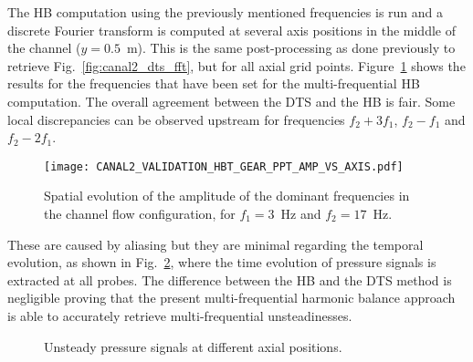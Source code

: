 The HB computation using the previously mentioned frequencies is
run and a discrete Fourier transform is computed at several axis positions
in the middle of the channel ($y=0.5$~m). 
This is the same post-processing as done previously to retrieve 
Fig.~\ref{fig:canal2_dts_fft}, but for all axial grid points.
Figure~\ref{fig:canal2_validation_hbt_gear_amp_vs_axis}
shows the results for the frequencies that have been set for the 
multi-frequential HB computation.
The overall agreement between the DTS and the HB is fair.  
Some local discrepancies can be
observed upstream for frequencies $f_2 + 3f_1$, $f_2 - f_1$ and $f_2 -
2f_1$. 
\begin{figure}[htp]
  \centering
  \texttt{[image: CANAL2\_VALIDATION\_HBT\_GEAR\_PPT\_AMP\_VS\_AXIS.pdf]}
  \caption{Spatial evolution of the amplitude of the dominant
    frequencies in the channel flow configuration, for $f_1 = 3$~Hz and $f_2 = 17$~Hz.}
  \label{fig:canal2_validation_hbt_gear_amp_vs_axis}
\end{figure}
These are caused by aliasing
but they are minimal regarding the temporal evolution, as
shown in Fig.~\ref{fig:canal2_validation_hbt_gear_time_ev}, where the
time evolution of pressure signals is extracted at all probes.  The
difference between the HB and the DTS method is negligible proving
that the present multi-frequential harmonic balance approach is
able to accurately retrieve multi-frequential unsteadinesses.
\begin{figure}[htp]
  \centering 
   \quad{}
  \caption{Unsteady pressure signals at different axial positions.}
  \label{fig:canal2_validation_hbt_gear_time_ev}
\end{figure}
